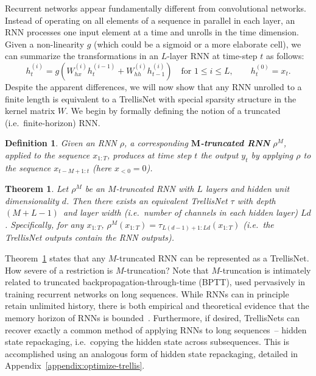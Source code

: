 \documentclass{article} \usepackage{iclr2019_conference,times}
\newtheorem{theorem}{Theorem}
\newtheorem{definition}{Definition}
\begin{document}
Recurrent networks appear fundamentally different from convolutional networks. Instead of operating on all elements of a sequence in parallel in each layer, an RNN processes one input element at a time and unrolls in the time dimension. Given a non-linearity $g$ (which could be a sigmoid or a more elaborate cell), we can summarize the transformations in an $L$-layer RNN at time-step $t$ as follows:
\begin{equation}
\label{eq:rnn-transformation}
h_t^{(i)} = g\left(W_{hx}^{(i)} h_t^{(i-1)} + W_{hh}^{(i)} h_{t-1}^{(i)}\right) \quad \text{for } 1 \leq i \leq L, \qquad h_t^{(0)} = x_t.
\end{equation}
Despite the apparent differences, we will now show that any RNN unrolled to a finite length is equivalent to a TrellisNet with special sparsity structure in the kernel matrix $W$.
We begin by formally defining the notion of a truncated (i.e.\ finite-horizon) RNN.

\begin{definition}
\label{dfn:unrolled-rnn}
Given an RNN $\rho$, a corresponding \emph{\textbf{$\mathbf{M}$-truncated RNN}} $\rho^M$, applied to the sequence $x_{1:T}$, produces at time step $t$ the output $y_t$ by applying $\rho$ to the sequence $x_{t-M+1:t}$ (here $x_{<0} = 0$).
\end{definition}
\vspace{.05in}

\begin{theorem}
\label{thm:trellisnet-rnn}
Let $\rho^M$ be an $M$-truncated RNN with $L$ layers and hidden unit dimensionality $d$. Then there exists an equivalent TrellisNet $\tau$ with depth \small$(M+L-1)$\normalsize\ and layer width (i.e.\ number of channels in each hidden layer) $Ld$. Specifically, for any $x_{1:T}$, $\rho^M(x_{1:T}) = \tau_{L(d-1)+1: Ld}(x_{1:T})$ (i.e.\ the TrellisNet outputs contain the RNN outputs).
\end{theorem}

Theorem~\ref{thm:trellisnet-rnn} states that any $M$-truncated RNN can be represented as a TrellisNet. How severe of a restriction is $M$-truncation? Note that $M$-truncation is intimately related to truncated backpropagation-through-time (BPTT), used pervasively in training recurrent networks on long sequences. While RNNs can in principle retain unlimited history, there is both empirical and theoretical evidence that the memory horizon of RNNs is bounded~\citep{bai2018empirical,khandelwal2018sharp,miller2018recurrent}.
Furthermore, if desired, TrellisNets can recover exactly a common method of applying RNNs to long sequences~-- hidden state repackaging, i.e.\ copying the hidden state across subsequences. This is accomplished using an analogous form of hidden state repackaging, detailed in Appendix~\ref{appendix:optimize-trellis}.
\end{document}
